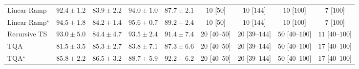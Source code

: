 \begin{tabular}{l|cccc|cccc|}
Linear Ramp & {\cellcolor[HTML]{800F7B}} \color[HTML]{F1F1F1} $92.4\pm 1.2$ & {\cellcolor[HTML]{8A54A6}} \color[HTML]{F1F1F1} $83.9\pm 2.2$ & {\cellcolor[HTML]{710A6D}} \color[HTML]{F1F1F1} $94.0\pm 1.0$ & {\cellcolor[HTML]{873696}} \color[HTML]{F1F1F1} $87.7\pm 2.1$ & {\cellcolor[HTML]{FFF7F3}} \color[HTML]{000000} $10$ [$50$] & {\cellcolor[HTML]{FFF7F3}} \color[HTML]{000000} $10$ [$144$] & {\cellcolor[HTML]{FFF7F3}} \color[HTML]{000000} $10$ [$100$] & {\cellcolor[HTML]{FFF7F3}} \color[HTML]{000000} $7$ [$100$] \\
Linear Ramp$^\star$ & {\cellcolor[HTML]{6C0968}} \color[HTML]{F1F1F1} $94.5\pm 1.8$ & {\cellcolor[HTML]{8A51A5}} \color[HTML]{F1F1F1} $84.2\pm 1.4$ & {\cellcolor[HTML]{62065F}} \color[HTML]{F1F1F1} $95.6\pm 0.7$ & {\cellcolor[HTML]{85288D}} \color[HTML]{F1F1F1} $89.2\pm 2.4$ & {\cellcolor[HTML]{FFF7F3}} \color[HTML]{000000} $10$ [$50$] & {\cellcolor[HTML]{FFF7F3}} \color[HTML]{000000} $10$ [$144$] & {\cellcolor[HTML]{FFF7F3}} \color[HTML]{000000} $10$ [$100$] & {\cellcolor[HTML]{FFF7F3}} \color[HTML]{000000} $7$ [$100$] \\
Recursive TS & {\cellcolor[HTML]{790D75}} \color[HTML]{F1F1F1} $93.0\pm 5.0$ & {\cellcolor[HTML]{8950A4}} \color[HTML]{F1F1F1} $84.4\pm 4.7$ & {\cellcolor[HTML]{740B70}} \color[HTML]{F1F1F1} $93.5\pm 2.4$ & {\cellcolor[HTML]{821580}} \color[HTML]{F1F1F1} $91.4\pm 7.4$ & {\cellcolor[HTML]{FFF4F0}} \color[HTML]{000000} $20$ [$40$--$50$] & {\cellcolor[HTML]{FFF4F0}} \color[HTML]{000000} $20$ [$39$--$144$] & {\cellcolor[HTML]{FEEDE9}} \color[HTML]{000000} $50$ [$40$--$100$] & {\cellcolor[HTML]{FFF6F2}} \color[HTML]{000000} $11$ [$40$--$100$] \\
TQA & {\cellcolor[HTML]{8B65AE}} \color[HTML]{F1F1F1} $81.5\pm 3.5$ & {\cellcolor[HTML]{8949A1}} \color[HTML]{F1F1F1} $85.3\pm 2.7$ & {\cellcolor[HTML]{8A54A6}} \color[HTML]{F1F1F1} $83.8\pm 7.1$ & {\cellcolor[HTML]{873A98}} \color[HTML]{F1F1F1} $87.3\pm 6.6$ & {\cellcolor[HTML]{FFF4F0}} \color[HTML]{000000} $20$ [$40$--$50$] & {\cellcolor[HTML]{FFF4F0}} \color[HTML]{000000} $20$ [$39$--$144$] & {\cellcolor[HTML]{FEEDE9}} \color[HTML]{000000} $50$ [$40$--$100$] & {\cellcolor[HTML]{FFF5F1}} \color[HTML]{000000} $17$ [$40$--$100$] \\
TQA$^\star$ & {\cellcolor[HTML]{88459F}} \color[HTML]{F1F1F1} $85.8\pm 2.2$ & {\cellcolor[HTML]{88409C}} \color[HTML]{F1F1F1} $86.5\pm 3.2$ & {\cellcolor[HTML]{852D90}} \color[HTML]{F1F1F1} $88.7\pm 5.9$ & {\cellcolor[HTML]{810F7C}} \color[HTML]{F1F1F1} $92.2\pm 6.2$ & {\cellcolor[HTML]{FFF4F0}} \color[HTML]{000000} $20$ [$40$--$50$] & {\cellcolor[HTML]{FFF4F0}} \color[HTML]{000000} $20$ [$39$--$144$] & {\cellcolor[HTML]{FEEDE9}} \color[HTML]{000000} $50$ [$40$--$100$] & {\cellcolor[HTML]{FFF5F1}} \color[HTML]{000000} $17$ [$40$--$100$] \\

\end{tabular}
